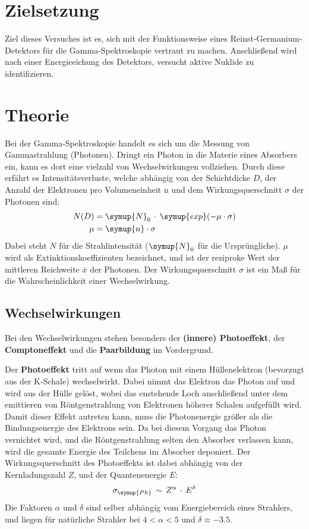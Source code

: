 \setcounter{page}{1}
\section*{Zielsetzung}

Ziel dieses Versuches ist es, sich mit der Funktionsweise eines Reinst-Germanium-Detektors
für die Gamma-Spektroskopie vertraut zu machen. Anschließend wird nach einer Energieeichung
des Detektors, versucht aktive Nuklide zu identifizieren.

\section{Theorie}
\label{sec:Theorie}

Bei der Gamma-Spektroskopie handelt es sich um die Messung von Gammastrahlung (Photonen).
Dringt ein Photon in die Materie eines Absorbers ein, kann es dort eine vielzahl von Wechselwirkungen vollziehen.
Durch diese erfährt es Intensitätsverluste, welche abhängig von der
Schichtdicke $D$, der Anzahl der Elektronen pro Volumeneinheit n und dem Wirkungsquerschnitt $\sigma$ der Photonen sind:
\begin{align}
  N(D) &= \symup{N}_0\,\cdot\,\symup{exp}(-\mu\cdot\sigma)\\
  \mu &= \symup{n}\cdot\sigma\\
\end{align}
Dabei steht $N$ für die Strahlintensität ($\symup{N}_0$ für die Ursprüngliche).
$\mu$ wird als Extinktionskoeffizienten bezeichnet, und ist der reziproke Wert der
mittleren Reichweite $\bar{x}$ der Photonen. Der Wirkungsquerschnitt $\sigma$ ist ein Maß
für die Wahrscheinlichkeit einer Wechselwirkung.

\subsection{Wechselwirkungen}
\label{sec:Wechselwirkungen}

Bei den Wechselwirkungen stehen besonders der \textbf{(innere) Photoeffekt}, der \textbf{Comptoneffekt} und
die \textbf{Paarbildung} im Vordergrund.

Der \textbf{Photoeffekt} tritt auf wenn das Photon mit einem Hüllenelektron (bevorzugt aus
der K-Schale) wechselwirkt. Dabei nimmt das Elektron das Photon auf und wird aus der
Hülle gelöst, wobei das enstehende Loch anschließend unter dem emittieren von Röntgenstrahlung von Elektronen höherer Schalen aufgefüllt wird.
Damit dieser Effekt autreten kann, muss die Photonenergie größer als die Bindungsenergie des Elektrons sein.
Da bei diesem Vorgang das Photon vernichtet wird, und die Röntgenstrahlung selten den Absorber verlassen kann,
wird die gesamte Energie des Teilchens im Absorber deponiert. Der Wirkungsquerschnitt des Photoeffekts ist dabei
abhängig von der Kernladungszahl $Z$, und der Quantenenergie $E$:
\begin{align}
  \sigma_{\symup{Ph}}\,\sim\,Z^{\alpha}\,\cdot\,E^{\delta}\\
\end{align}
Die Faktoren $\alpha$ und $\delta$ sind selber abhängig vom Energiebereich eines Strahlers, und liegen für
natürliche Strahler bei $4 < \alpha < 5$ und $\delta \approx -3.5$.


